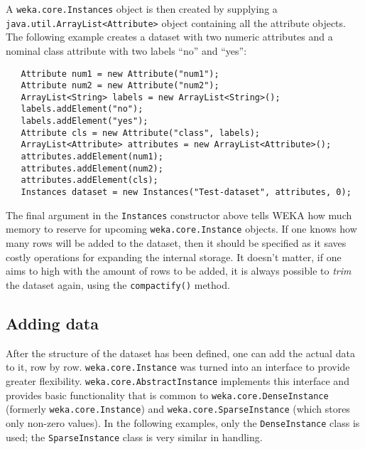 A \texttt{weka.core.Instances} object is then created by supplying a
\texttt{java.util.ArrayList<Attribute>} object containing all the attribute
objects. The following
example creates a dataset with two numeric attributes and a nominal class
attribute with two labels ``no'' and ``yes'':
\begin{verbatim}
   Attribute num1 = new Attribute("num1");
   Attribute num2 = new Attribute("num2");
   ArrayList<String> labels = new ArrayList<String>();
   labels.addElement("no");
   labels.addElement("yes");
   Attribute cls = new Attribute("class", labels);
   ArrayList<Attribute> attributes = new ArrayList<Attribute>();
   attributes.addElement(num1);
   attributes.addElement(num2);
   attributes.addElement(cls);
   Instances dataset = new Instances("Test-dataset", attributes, 0);
\end{verbatim}
The final argument in the \texttt{Instances} constructor above tells WEKA how
much memory to reserve for upcoming \texttt{weka.core.Instance} objects. If one
knows how many rows will be added to the dataset, then it should be specified
as it saves costly operations for expanding the internal storage. It doesn't
matter, if one aims to high with the amount of rows to be added, it is always
possible to \textit{trim} the dataset again, using the \texttt{compactify()}
method.

\subsection{Adding data}
After the structure of the dataset has been defined, one can add the actual
data to it, row by row. \texttt{weka.core.Instance} was turned into an
interface to provide greater flexibility. \texttt{weka.core.AbstractInstance}
implements this interface and provides basic functionality that is common to
\texttt{weka.core.DenseInstance} (formerly
\texttt{weka.core.Instance}) and \texttt{weka.core.SparseInstance} (which stores
only non-zero values). In the following examples, only the
\texttt{DenseInstance} class is used; the \texttt{SparseInstance} class is very
similar in handling.

